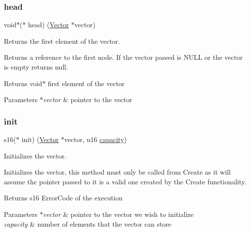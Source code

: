 \subsubsection{\texorpdfstring{head}{head}}
{\footnotesize\ttfamily void$\ast$($\ast$ head) (\hyperlink{structadt__vector__s}{Vector} $\ast$vector)}



Returns the first element of the vector. 

Returns a reference to the first node. If the vector passed is N\+U\+LL or the vector is empty returns null.

\begin{DoxyReturn}{Returns}
void$\ast$ first element of the vector 
\end{DoxyReturn}

\begin{DoxyParams}{Parameters}
{\em $\ast$vector} & pointer to the vector \\
\hline
\end{DoxyParams}
\mbox{\label{structadt__vector__ops__s_a3af2d52d5fe73b7755a0c816ed974caf}} 
\subsubsection{\texorpdfstring{init}{init}}
{\footnotesize\ttfamily s16($\ast$ init) (\hyperlink{structadt__vector__s}{Vector} $\ast$vector, u16 \hyperlink{structadt__vector__ops__s_a41c9de03c40660dfbd699958ae366738}{capacity})}



Initializes the vector. 

Initializes the vector, this method must only be called from Create as it will assume the pointer passed to it is a valid one created by the Create functionality.

\begin{DoxyReturn}{Returns}
s16 Error\+Code of the execution 
\end{DoxyReturn}

\begin{DoxyParams}{Parameters}
{\em $\ast$vector} & pointer to the vector we wish to initialize \\
\hline
{\em capacity} & number of elements that the vector can store \\
\hline
\end{DoxyParams}
\mbox{\label{structadt__vector__ops__s_a5c83f49d51cdce1f4d8af47c0be2af74}} 
